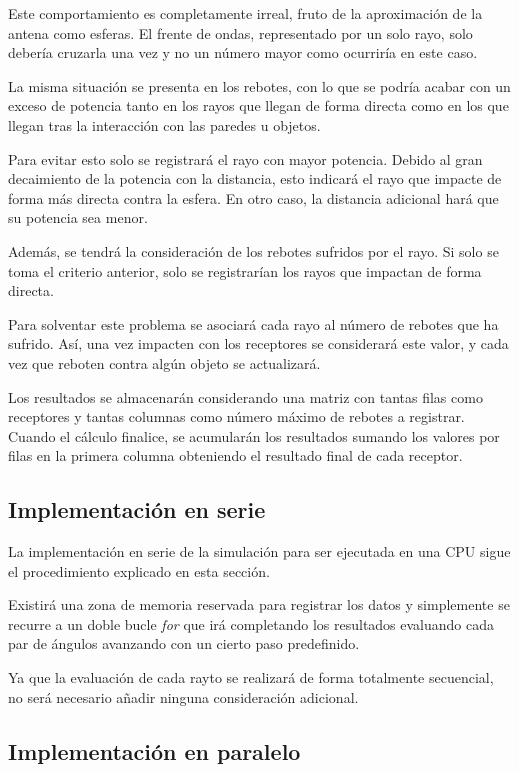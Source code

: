 Este comportamiento es completamente irreal, fruto de la aproximación de la antena como esferas.
El frente de ondas, representado por un solo rayo, solo debería cruzarla una vez y no un número mayor como ocurriría en este caso.

La misma situación se presenta en los rebotes, con lo que se podría acabar con un exceso de potencia tanto en los rayos que llegan de forma directa como en los que llegan tras la interacción con las paredes u objetos.

Para evitar esto solo se registrará el rayo con mayor potencia.
Debido al gran decaimiento de la potencia con la distancia, esto indicará el rayo que impacte de forma más directa contra la esfera.
En otro caso, la distancia adicional hará que su potencia sea menor.

Además, se tendrá la consideración de los rebotes sufridos por el rayo.
Si solo se toma el criterio anterior, solo se registrarían los rayos que impactan de forma directa.

Para solventar este problema se asociará cada rayo al número de rebotes que ha sufrido.
Así, una vez impacten con los receptores se considerará este valor, y cada vez que reboten contra algún objeto se actualizará.

Los resultados se almacenarán considerando una matriz con tantas filas como receptores y tantas columnas como número máximo de rebotes a registrar.
Cuando el cálculo finalice, se acumularán los resultados sumando los valores por filas en la primera columna obteniendo el resultado final de cada receptor.

\subsection{Implementación en serie}

La implementación en serie de la simulación para ser ejecutada en una CPU sigue el procedimiento explicado en esta sección.

Existirá una zona de memoria reservada para registrar los datos y simplemente se recurre a un doble bucle \textit{for} que irá completando los resultados evaluando cada par de ángulos avanzando con un cierto paso predefinido.

Ya que la evaluación de cada rayto se realizará de forma totalmente secuencial, no será necesario añadir ninguna consideración adicional.

\subsection{Implementación en paralelo}

